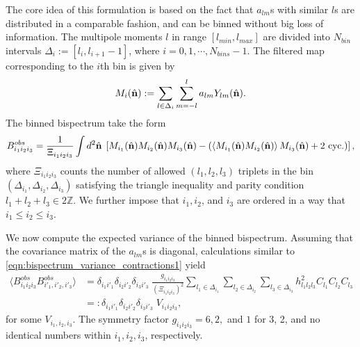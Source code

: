 The core idea of this formulation is based on the fact that $a_{lm}$s with similar $l$s are distributed in a comparable fashion, and can be binned without big loss of information. The multipole moments $l$ in range $[l_{min},l_{max}]$ are divided into $N_{bin}$ intervals $\Delta_i := [l_i,l_{i+1}-1]$, where $i=0,1,\cdots,N_{bins}-1$.  The filtered map corresponding to the $i$th bin is given by
\begin{align}
		M_i(\hat{\mathbf{n}}) := \sum_{l\in\Delta_i}\sum_{m=-l}^{l} a_{lm} Y_{lm}(\hat{\mathbf{n}}).
\end{align}
The binned bispectrum take the form
\begin{align}
	B^{obs}_{i_1 i_2 i_3} = \frac{1}{\Xi_{i_1 i_2 i_3}} \int d^2 \hat{\mathbf{n}} \; \left[ M_{i_1} (\hat{\mathbf{n}}) M_{i_2} (\hat{\mathbf{n}}) M_{i_3} (\hat{\mathbf{n}}) - \left( \left< M_{i_1} (\hat{\mathbf{n}}) M_{i_2} (\hat{\mathbf{n}}) \right> M_{i_3} (\hat{\mathbf{n}}) + \text{2 cyc.}\right)  \right],
\end{align}
where $\Xi_{i_1 i_2 i_3}$ counts the number of allowed $(l_1,l_2,l_3)$ triplets in the bin $(\Delta_{i_1},\Delta_{i_2},\Delta_{i_3})$ satisfying the triangle inequality and parity condition $l_1+l_2+l_3 \in 2\mathbb{Z}$. We further impose that $i_1,i_2$, and $i_3$ are ordered in a way that $i_1 \le i_2 \le i_3$.

We now compute the expected variance of the binned bispectrum. Assuming that the covariance matrix of the $a_{lm}$s is diagonal, calculations similar to \eqref{eqn:bispectrum_variance_contractions1} yield
\begin{align}
	\langle B^{obs}_{i_1 i_2 i_3} B^{obs}_{i'_1,i'_2,i'_3} \rangle &=  \delta_{i_1 i'_1} \delta_{i_2 i'_2} \delta_{i_3 i'_3} \; \frac{g_{i_1 i_2 i_3}}{(\Xi_{i_1 i_2 i_3})^2} \sum_{l_1 \in \Delta_{i_1}} \sum_{l_2 \in \Delta_{i_2}} \sum_{l_3 \in \Delta_{i_3}} h^2_{l_1 l_2 l_3} C_{l_1} C_{l_2} C_{l_3} \\
	&=: \delta_{i_1 i'_1} \delta_{i_2 i'_2} \delta_{i_3 i'_3} \; V_{i_1 i_2 i_3},
\end{align}
for some $V_{i_1,i_2,i_3}$. The symmetry factor $g_{i_1 i_2 i_3}=6,2,$ and $1$ for 3, 2, and no identical numbers within $i_1,i_2,i_3$, respectively.

